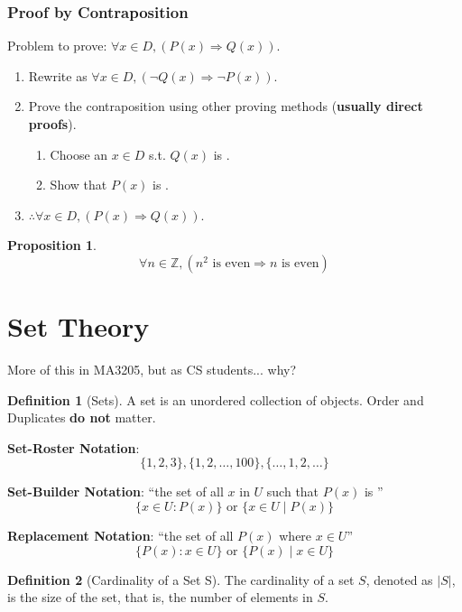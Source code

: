 \documentclass{article}
\theoremstyle{plain}
\newtheorem{proposition}[theorem]{Proposition}
\theoremstyle{definition}
\newtheorem*{definition}{Definition}
\theoremstyle{remark}
\begin{document}
\subsubsection{Proof by Contraposition}
Problem to prove: $\forall x \in D, (P(x) \Rightarrow Q(x))$.
\begin{enumerate}[label=\arabic*.]
    \item Rewrite as $\forall x \in D, (\neg Q(x) \Rightarrow \neg P(x))$.
    \item Prove the contraposition using other proving methods (\textbf{usually direct proofs}).
    \begin{enumerate}[label*=\arabic*.]
        \item Choose an $x \in D$ s.t. $Q(x)$ is \textcolor{red}{}.
        \item Show that $P(x)$ is \textcolor{red}{}.
    \end{enumerate}
    \item $\therefore \forall x \in D, (P(x) \Rightarrow Q(x))$.
\end{enumerate}

\begin{proposition}
    \[\forall n \in \mathbb{Z}, (n^2 \text{ is even} \Rightarrow n \text{ is even})\]
\end{proposition}

\newpage

\section{Set Theory}
More of this in MA3205, but as CS students... why?

\begin{definition}[Sets]
    A set is an unordered collection of objects. 
    Order and Duplicates \textbf{do not} matter.
    
    \textbf{Set-Roster Notation}:
    \[\{1, 2, 3\}, \{1, 2, \dots, 100\}, \{\dots, 1, 2, \dots\}\]

    \textbf{Set-Builder Notation}:
    ``the set of all $x$ in $U$ such that $P(x)$ is \textcolor{blue}{}''
    \[\{x \in U : P(x)\} \text{ or } \{x \in U \mid P(x)\}\]

    \textbf{Replacement Notation}:
    ``the set of all $P(x)$ where $x \in U$''
    \[\{P(x) : x \in U \} \text{ or } \{P(x) \mid x \in U \}\]
\end{definition}

\begin{definition}[Cardinality of a Set S]
    The cardinality of a set $S$, denoted as $|S|$, is the size of the set, that is, the number of elements in $S$.
\end{definition}
\end{document}
